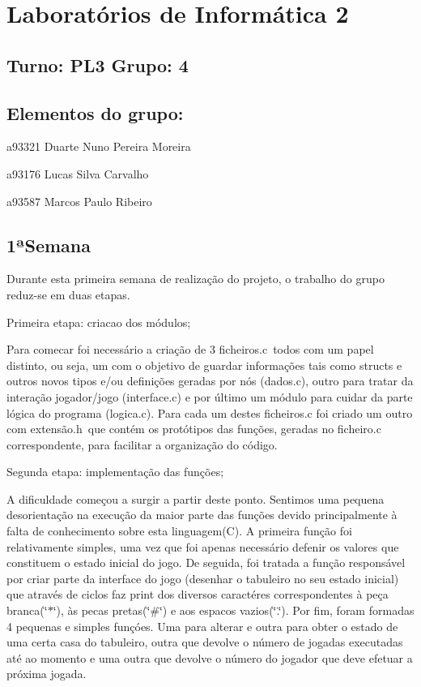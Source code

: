 \section*{Laboratórios de Informática 2}

\subsection*{Turno\+: P\+L3 Grupo\+: 4}

\subsection*{Elementos do grupo\+:}


\begin{DoxyItemize}
\item a93321 Duarte Nuno Pereira Moreira
\item a93176 Lucas Silva Carvalho
\item a93587 Marcos Paulo Ribeiro
\end{DoxyItemize}

\subsection*{1ª\+Semana}

Durante esta primeira semana de realização do projeto, o trabalho do grupo reduz-\/se em duas etapas.

Primeira etapa\+: criacao dos módulos;

Para comecar foi necessário a criação de 3 ficheiros.\+c todos com um papel distinto, ou seja, um com o objetivo de guardar informações tais como structs e outros novos tipos e/ou definições geradas por nós (dados.\+c), outro para tratar da interação jogador/jogo (interface.\+c) e por último um módulo para cuidar da parte lógica do programa (logica.\+c). Para cada um destes ficheiros.\+c foi criado um outro com extensão.\+h que contém os protótipos das funções, geradas no ficheiro.\+c correspondente, para facilitar a organização do código.

Segunda etapa\+: implementação das funções;

A dificuldade começou a surgir a partir deste ponto. Sentimos uma pequena desorientação na execução da maior parte das funções devido principalmente à falta de conhecimento sobre esta linguagem(\+C). A primeira função foi relativamente simples, uma vez que foi apenas necessário defenir os valores que constituem o estado inicial do jogo. De seguida, foi tratada a função responsável por criar parte da interface do jogo (desenhar o tabuleiro no seu estado inicial) que através de ciclos faz print dos diversos caractéres correspondentes à peça branca(\char`\"{}$\ast$\char`\"{}), às pecas pretas(\char`\"{}\#\char`\"{}) e aos espacos vazios(\char`\"{}.\char`\"{}). Por fim, foram formadas 4 pequenas e simples funçóes. Uma para alterar e outra para obter o estado de uma certa casa do tabuleiro, outra que devolve o número de jogadas executadas até ao momento e uma outra que devolve o número do jogador que deve efetuar a próxima jogada.

